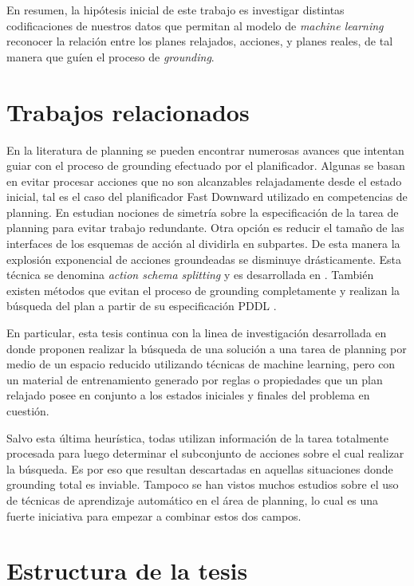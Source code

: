 En resumen, la hipótesis inicial de este trabajo es investigar distintas
codificaciones de nuestros datos que permitan al modelo de \emph{machine
learning} reconocer la relación entre los planes relajados, acciones, y planes
reales, de tal manera que guíen el proceso de \emph{grounding}.

\section{Trabajos relacionados}

En la literatura de planning se pueden encontrar numerosas avances que intentan
guiar con el proceso de grounding efectuado por el planificador. Algunas se
basan en evitar procesar acciones que no son alcanzables relajadamente desde el
estado inicial, tal es el caso del planificador Fast Downward
\citep{Helmert-2011} utilizado en competencias de planning. En
\citep{Röger_Sievers_Katz_2018} estudian nociones de simetría sobre la
especificación de la tarea de planning para evitar trabajo redundante. Otra
opción es reducir el tamaño de las interfaces de los esquemas de acción al
dividirla en subpartes. De esta manera la explosión exponencial de acciones
groundeadas se disminuye drásticamente. Esta técnica se denomina \emph{action
schema splitting} y es desarrollada en
\citep{Areces_Bustos_Dominguez_Hoffmann_2014}. También existen métodos que
evitan el proceso de grounding completamente y realizan la búsqueda del plan a
partir de su especificación PDDL \citep{Penberthy-1992}.

En particular, esta tesis continua con la linea de investigación
desarrollada en \citep{Gnad_Torralba_Dominguez_Areces_Bustos_2019} donde proponen
realizar la búsqueda de una solución a una tarea de planning por medio de un
espacio reducido utilizando técnicas de machine learning, pero con un material de
entrenamiento generado por reglas o propiedades que un plan relajado posee en
conjunto a los estados iniciales y finales del problema en cuestión.

Salvo esta última heurística, todas utilizan información de la tarea totalmente
procesada para luego determinar el subconjunto de acciones sobre el cual
realizar la búsqueda. Es por eso que resultan descartadas en aquellas
situaciones donde grounding total es inviable. Tampoco se han vistos muchos
estudios sobre el uso de técnicas de aprendizaje automático en el área de
planning, lo cual es una fuerte iniciativa para empezar a combinar estos dos
campos.

\section{Estructura de la tesis}

